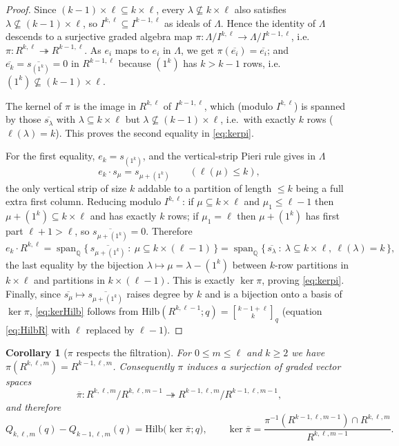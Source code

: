 \documentclass{amsart}
\newtheorem{corollary}{Corollary}
\theoremstyle{definition}
\newcommand{\Hilb}{\mathrm{Hilb}}
\newcommand{\qbin}[2]{\genfrac{[}{]}{0pt}{}{#1}{#2}_q}
\newcommand{\Q}{\mathbb{Q}}
\newcommand{\rkl}{R^{k,\ell}}
\newcommand{\Rklm}{R^{k,\ell,m}}
\begin{document}
\begin{proof}
Since $(k-1)\times\ell\subseteq k\times\ell$, every $\lambda\not\subseteq k\times\ell$
also satisfies $\lambda\not\subseteq(k-1)\times\ell$, so $I^{k,\ell}\subseteq
I^{k-1,\ell}$ as ideals of $\Lambda$. Hence the identity of $\Lambda$ descends to a
surjective graded algebra map $\pi\colon\Lambda/I^{k,\ell}\to\Lambda/I^{k-1,\ell}$,
i.e.\ $\pi\colon\rkl\twoheadrightarrow R^{k-1,\ell}$. As $e_i$ maps to $e_i$ in
$\Lambda$, we get $\pi(\overline{e_i})=\overline{e_i}$; and
$\overline{e_k}=\overline{s_{(1^k)}}=0$ in $R^{k-1,\ell}$ because $(1^k)$ has $k>k-1$
rows, i.e.\ $(1^k)\not\subseteq(k-1)\times\ell$.

The kernel of $\pi$ is the image in $\rkl$ of $I^{k-1,\ell}$, which (modulo
$I^{k,\ell}$) is spanned by those $\overline{s_\lambda}$ with $\lambda\subseteq
k\times\ell$ but $\lambda\not\subseteq(k-1)\times\ell$, i.e.\ with exactly $k$ rows
($\ell(\lambda)=k$). This proves the second equality in \eqref{eq:kerpi}.

For the first equality, $e_k=s_{(1^k)}$, and the vertical-strip Pieri rule gives in
$\Lambda$
\[
e_k\cdot s_\mu=s_{\mu+(1^k)}\qquad(\ell(\mu)\le k),
\]
the only vertical strip of size $k$ addable to a partition of length $\le k$ being a
full extra first column. Reducing modulo $I^{k,\ell}$: if $\mu\subseteq k\times\ell$
and $\mu_1\le\ell-1$ then $\mu+(1^k)\subseteq k\times\ell$ and has exactly $k$ rows;
if $\mu_1=\ell$ then $\mu+(1^k)$ has first part $\ell+1>\ell$, so
$\overline{s_{\mu+(1^k)}}=0$. Therefore
\[
e_k\cdot\rkl=\operatorname{span}_{\Q}
\{\,\overline{s_{\mu+(1^k)}}\ :\ \mu\subseteq k\times(\ell-1)\,\}
=\operatorname{span}_{\Q}\{\,\overline{s_\lambda}\ :\ \lambda\subseteq k\times\ell,\ \ell(\lambda)=k\,\},
\]
the last equality by the bijection $\lambda\mapsto\mu=\lambda-(1^k)$ between
$k$-row partitions in $k\times\ell$ and partitions in $k\times(\ell-1)$. This is
exactly $\ker\pi$, proving \eqref{eq:kerpi}. Finally, since $\overline{s_{\mu}}\mapsto
\overline{s_{\mu+(1^k)}}$ raises degree by $k$ and is a bijection onto a basis of
$\ker\pi$, \eqref{eq:kerHilb} follows from $\Hilb(R^{k,\ell-1};q)=\qbin{k-1+\ell}{k}$
(equation \eqref{eq:HilbR} with $\ell$ replaced by $\ell-1$).
\end{proof}

\begin{corollary}[$\pi$ respects the filtration]\label{cor:pifiltr}
For $0\le m\le \ell$ and $k\ge2$ we have $\pi(\Rklm)=R^{k-1,\ell,m}$. Consequently
$\pi$ induces a surjection of graded vector spaces
\[
\overline{\pi}\colon \Rklm/R^{k,\ell,m-1}\twoheadrightarrow
R^{k-1,\ell,m}/R^{k-1,\ell,m-1},
\]
and therefore
\begin{equation}\label{eq:Qdiff}
Q_{k,\ell,m}(q)-Q_{k-1,\ell,m}(q)=\Hilb\big(\ker\overline{\pi};q\big),
\qquad
\ker\overline{\pi}=\frac{\pi^{-1}(R^{k-1,\ell,m-1})\cap \Rklm}{R^{k,\ell,m-1}} .
\end{equation}
\end{corollary}
\end{document}
